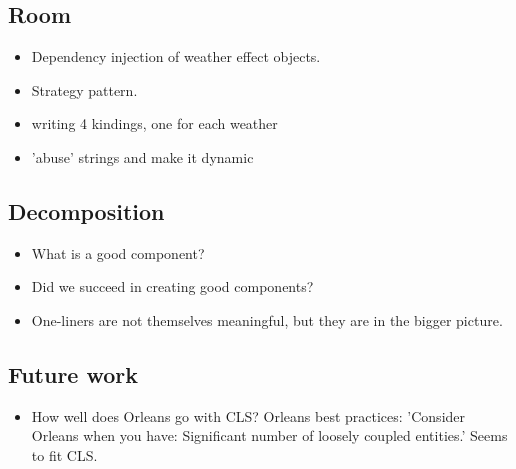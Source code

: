 

\subsection{Room}
\begin{itemize}
	\item Dependency injection of weather effect objects.
	\item Strategy pattern.
	\item writing 4 kindings, one for each weather
	\item 'abuse' strings and make it dynamic
\end{itemize}

\subsection{Decomposition}
\begin{itemize}
	\item What is a good component?
	\item Did we succeed in creating good components?
	\item One-liners are not themselves meaningful, but they are in the bigger picture.
\end{itemize}

\subsection{Future work}
\begin{itemize}
	\item How well does Orleans go with CLS? Orleans best practices: 'Consider Orleans when you have: Significant number of loosely coupled entities.' Seems to fit CLS. 
\end{itemize}